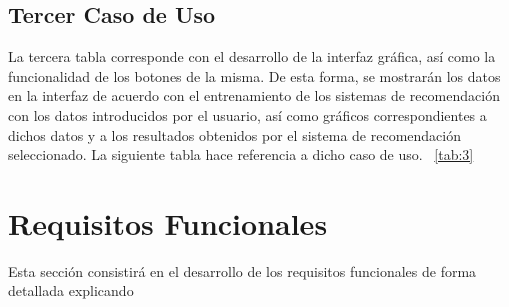 \subsection{Tercer Caso de Uso}
La tercera tabla corresponde con  el desarrollo de la interfaz gráfica, así como la funcionalidad de los botones de la misma. De esta forma, se mostrarán los datos en la interfaz de acuerdo con el entrenamiento de los sistemas de recomendación con los datos introducidos por el usuario, así como gráficos correspondientes a dichos datos y a los resultados obtenidos por el sistema de recomendación seleccionado. La siguiente tabla hace referencia a dicho caso de uso. ~\ref{tab:3}
\begin{table}[]
\caption{Tabla Caso de Uso 3}
\label{tab:3 }
\end{table}


\section{Requisitos Funcionales}
Esta sección consistirá en el desarrollo de los requisitos funcionales de forma detallada explicando 
